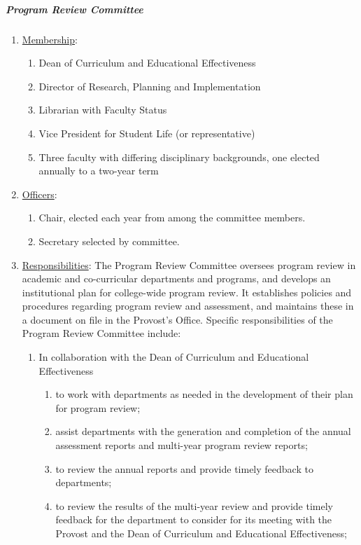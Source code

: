 				\subparagraph{Program Review Committee}
					\begin{enumerate}[label=\alph*)]
						\item{\underline{Membership}:
							\begin{enumerate}[label=\arabic*)]
								\item{Dean of Curriculum and Educational Effectiveness}
								\item{Director of Research, Planning and Implementation}
								\item{Librarian with Faculty Status}
								\item{Vice President for Student Life (or representative)}
								\item{Three faculty with differing disciplinary backgrounds, one elected annually to a two-year term}
							\end{enumerate}
						}
						\item{\underline{Officers}:
							\begin{enumerate}[label=\arabic*)]
								\item{Chair, elected each year from among the committee members.}
								\item{Secretary selected by committee.}
							\end{enumerate}
						}
						\item{\underline{Responsibilities}:
							The Program Review Committee oversees program review in academic and co-curricular departments and programs, and develops an institutional plan for college-wide program review.  It establishes policies and procedures regarding program review and assessment, and maintains these in a document on file in the Provost's Office.  Specific responsibilities of the Program Review Committee include:
							\begin{enumerate}[label=\arabic*)]
								\item{In collaboration with the Dean of Curriculum and Educational Effectiveness
									\begin{enumerate}[label=(\alph*)]
										\item{to work with departments as needed in the development of their plan for program review;}
										\item{assist departments with the generation and completion of the annual assessment reports and multi-year program review reports;}
										\item{to review the annual reports and provide timely feedback to departments;}
										\item{to review the results of the multi-year review and provide timely feedback for the department to consider for its meeting with the Provost and the Dean of Curriculum and Educational Effectiveness;}

\end{enumerate}}
\end{enumerate}}
\end{enumerate}
